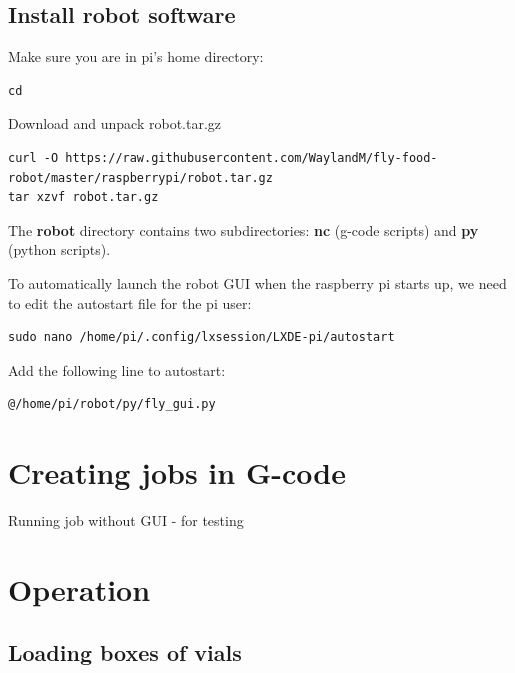 \documentclass[]{book}
\theoremstyle{definition}
\theoremstyle{definition}
\theoremstyle{remark}
\begin{document}
\section{Install robot software}\label{install-robot-software}

Make sure you are in pi's home directory:

\begin{verbatim}
cd
\end{verbatim}

Download and unpack robot.tar.gz

\begin{verbatim}
curl -O https://raw.githubusercontent.com/WaylandM/fly-food-robot/master/raspberrypi/robot.tar.gz
tar xzvf robot.tar.gz
\end{verbatim}

The \textbf{robot} directory contains two subdirectories: \textbf{nc}
(g-code scripts) and \textbf{py} (python scripts).

To automatically launch the robot GUI when the raspberry pi starts up,
we need to edit the autostart file for the pi user:

\begin{verbatim}
sudo nano /home/pi/.config/lxsession/LXDE-pi/autostart
\end{verbatim}

Add the following line to autostart:

\begin{verbatim}
@/home/pi/robot/py/fly_gui.py
\end{verbatim}

\chapter{Creating jobs in G-code}\label{creating-jobs-in-g-code}

Running job without GUI - for testing

\chapter{Operation}\label{operation}

\section{Loading boxes of vials}\label{loading-boxes-of-vials}


\end{document}
